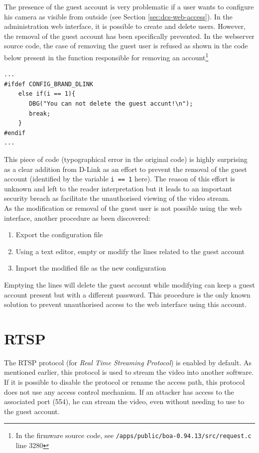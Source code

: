 The presence of the guest account is very problematic if a user wants to configure his camera as visible from outside (see Section \ref{sec:dcs-web-access}).
In the administration web interface, it is possible to create and delete users.
However, the removal of the guest account has been specifically prevented.
In the webserver source code, the case of removing the guest user is refused as shown in the code below present in the function responsible for removing an account\footnote{In the firmware source code, see \texttt{/apps/public/boa-0.94.13/src/request.c} line 3280}

\begin{verbatim}
...
#ifdef CONFIG_BRAND_DLINK
    else if(i == 1){
       DBG("You can not delete the guest accunt!\n");
       break;
    }
#endif
...
\end{verbatim}

This piece of code (typographical error in the original code) is highly surprising as a clear addition from D-Link as an effort to prevent the removal of the guest account (identified by the variable \texttt{i == 1} here).
The reason of this effort is unknown and left to the reader interpretation but it leads to an important security breach as facilitate the unauthorised viewing of the video stream.\\

As the modification or removal of the guest user is not possible using the web interface, another procedure as been discovered:

\begin{enumerate}
\item Export the configuration file
\item Using a text editor, empty or modify the lines related to the guest account
\item Import the modified file as the new configuration
\end{enumerate}

Emptying the lines will delete the guest account while modifying can keep a guest account present but with a different password.
This procedure is the only known solution to prevent unauthorised access to the web interface using this account.

\section{RTSP}
\label{sec:dcs-rtsp}

The RTSP protocol (for \emph{Real Time Streaming Protocol}) is enabled by default.
As mentioned earlier, this protocol is used to stream the video into another software.
If it is possible to disable the protocol or rename the access path, this protocol does not use any access control mechanism.
If an attacker has access to the associated port (554), he can stream the video, even without needing to use to the guest account.\\

